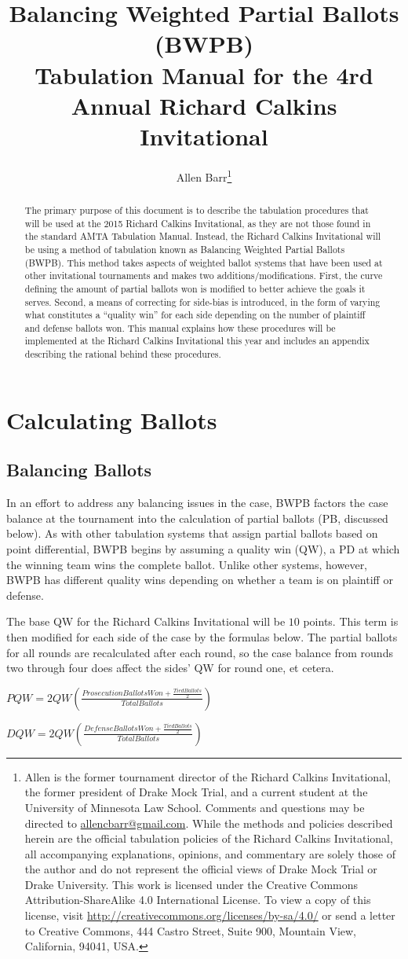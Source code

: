 \documentclass{article}
\title{\textbf{Balancing Weighted Partial Ballots (BWPB)}\\ \large  Tabulation Manual for the 4rd Annual Richard Calkins Invitational}
\author{Allen Barr\footnote{Allen is the former tournament director of the Richard Calkins Invitational, the former president of Drake Mock Trial, and a current student at the University of Minnesota Law School.  Comments and questions may be directed to \href{mailto:allencbarr@gmail.com}{allencbarr@gmail.com}.  While the methods and policies described herein are the official tabulation policies of the Richard Calkins Invitational, all accompanying explanations, opinions, and commentary are solely those of the author and do not represent the official views of Drake Mock Trial  or Drake University.  This work is licensed under the Creative Commons Attribution-ShareAlike 4.0 International License. To view a copy of this license, visit \url{http://creativecommons.org/licenses/by-sa/4.0/} or send a letter to Creative Commons, 444 Castro Street, Suite 900, Mountain View, California, 94041, USA.}}
\begin{document}
\maketitle
\begin{abstract}
The primary purpose of this document is to describe the tabulation procedures that will be used at the 2015 Richard Calkins Invitational, as they are not those found in the standard AMTA Tabulation Manual.  Instead, the Richard Calkins Invitational will be using a method of tabulation known as Balancing Weighted Partial Ballots (BWPB).  This method takes aspects of weighted ballot systems that have been used at other invitational tournaments and makes two additions/modifications.  First, the curve defining the amount of partial ballots won is modified to better achieve the goals it serves.  Second, a means of correcting for side-bias is introduced, in the form of varying what constitutes a ``quality win'' for each side depending on the number of plaintiff and defense ballots won.  This manual explains how these procedures will be implemented at the Richard Calkins Invitational this year and includes an appendix describing the rational behind these procedures.
\end{abstract}
\section{Calculating Ballots}
\subsection{Balancing Ballots}
In an effort to address any balancing issues in the case, BWPB factors the case balance at the tournament into the calculation of partial ballots (PB, discussed below). As with other tabulation systems that assign partial ballots based on point differential, BWPB begins by assuming a quality win (QW), a PD at which the winning team wins the complete ballot. Unlike other systems, however, BWPB has different quality wins depending on whether a team is on plaintiff or defense.

The base QW for the Richard Calkins Invitational will be $10$ points. This term is then modified for each side of the case by the formulas below. The partial ballots for all rounds are recalculated after each round, so the case balance from rounds two through four does affect the sides' QW for round one, et cetera.
\begin{center}
$PQW=2QW\left(\frac{ProsecutionBallotsWon+\frac{TiedBallots}{2}}{TotalBallots}\right)$

$DQW=2QW\left(\frac{DefenseBallotsWon+\frac{TiedBallots}{2}}{TotalBallots}\right)$
\end{center}
\end{document}
